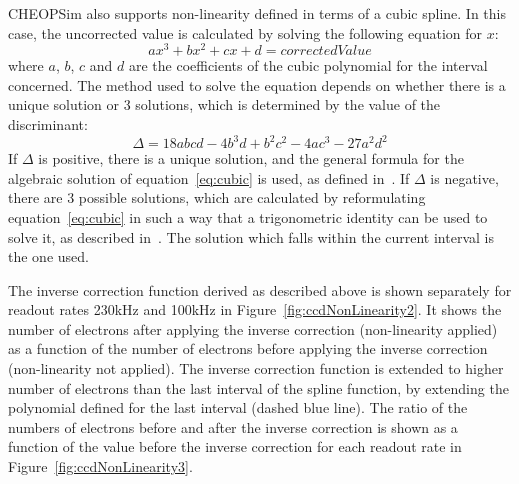 \documentclass[11pt]{article}      %
\begin{document}
CHEOPSim also supports non-linearity defined in terms of a cubic spline. In this case, the uncorrected value is calculated by solving the following equation for $x$:
\begin{equation}
ax^3 + bx^2 + cx + d = correctedValue
\label{eq:cubic}
\end{equation}
where $a$, $b$, $c$ and $d$ are the coefficients of the cubic polynomial for the interval concerned. The method used to solve the equation depends on whether there is a unique solution or 3 solutions, which is determined by the value of the discriminant:
$$\Delta = 18abcd - 4b^3d + b^2c^2 - 4ac^3 - 27a^2d^2$$
If $\Delta$ is positive, there is a unique solution, and the general formula for the algebraic solution of equation~\ref{eq:cubic} is used, as defined in~\cite{wikipedia_cubic}.
If $\Delta$ is negative, there are 3 possible solutions, which are calculated by reformulating equation~\ref{eq:cubic} in such a way that a trigonometric identity can be used to solve it, as described in~\cite{wikipedia_cubic}. The solution which falls within the current interval is the one used.

The inverse correction function derived as described above is shown separately for readout rates 230kHz and 100kHz in Figure~\ref{fig:ccdNonLinearity2}. It shows the number of electrons after applying the inverse correction (non-linearity applied) as a function of the number of electrons before applying the inverse correction (non-linearity not applied). The inverse correction function is extended to higher number of electrons than the last interval of the spline function, by extending the polynomial defined for the last interval (dashed blue line). The ratio of the numbers of electrons before and after the inverse correction is shown as a function of the value before the inverse correction for each readout rate in Figure~\ref{fig:ccdNonLinearity3}.
\end{document}
